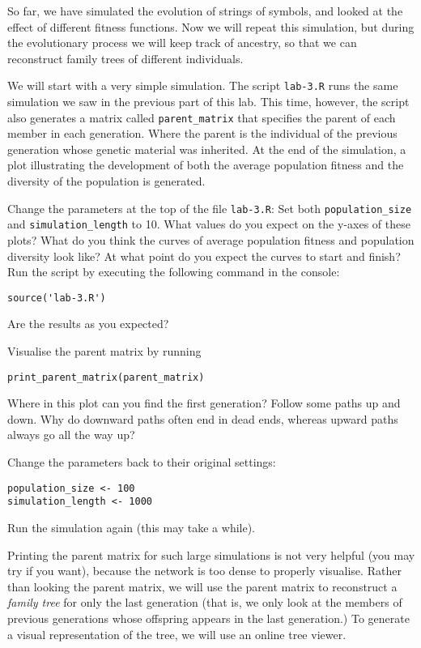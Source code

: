 \documentclass[a4paper, 9pt]{article}
\begin{document}
So far, we have simulated the evolution of strings of symbols,
and looked at the effect of different fitness functions. Now we will
repeat this simulation, but during the evolutionary process we will keep
track of ancestry, so that we can reconstruct family trees of different
individuals.

We will start with a very simple simulation.
The script \texttt{lab-3.R} runs the same simulation we saw in the
previous part of this lab. This time, however, the script also generates a matrix
called \texttt{parent\_matrix} that specifies the parent of each member
in each generation. Where the parent is the individual of the previous
generation whose genetic material was inherited. At the end of the
simulation, a plot illustrating the development of both the average
population fitness and the diversity of the population is generated.

\begin{exercise}
\action Change the parameters at the top of the file \verb|lab-3.R|: Set both \texttt{population\_size} and \texttt{simulation\_length} to 10. 
What values do you expect on the y-axes of these plots? 
What do you think the curves of average population fitness and population diversity look like? 
At what point do you expect the curves to start and finish?
\action Run the script by executing the following command in the console: 
\begin{lstlisting}
source('lab-3.R')
\end{lstlisting}
Are the results as you expected?

\action Visualise the parent matrix by running
\begin{lstlisting}
print_parent_matrix(parent_matrix)
\end{lstlisting}
Where in this plot can you find the first generation?
\askstar Follow some paths up and down. Why do downward paths often end in dead ends, whereas upward paths always go all the way up?
\end{exercise}

\begin{exercise}
\action Change the parameters back to their original settings:\begin{lstlisting}
population_size <- 100
simulation_length <- 1000
\end{lstlisting}
\action Run the simulation again (this may take a while).
\end{exercise}

Printing the parent matrix for such large simulations is not very
helpful (you may try if you want), because the network is too dense to
properly visualise. Rather than looking the parent matrix, we will use
the parent matrix to reconstruct a \emph{family tree} for only the last
generation (that is, we only look at the members of previous generations
whose offspring appears in the last generation.)
To generate a visual representation of the tree, we will use an online
tree viewer.
\end{document}

